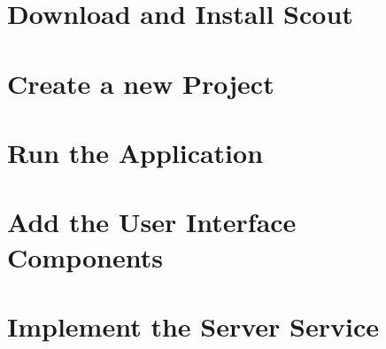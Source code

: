 \documentclass{article}
\begin{document}
\section{Download and Install Scout}

\section{Create a new Project}

\section{Run the Application}

\section{Add the User Interface Components}

\section{Implement the Server Service}

\end{document}
